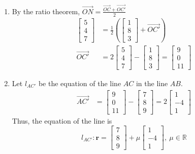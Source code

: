 \documentclass[11pt,a4paper]{book}
\newcommand{\R}{\mathbb{R}}
\begin{document}
\begin{example}
\begin{enumerate}[label=(\alph*)]
\item  By the ratio theorem, ${\displaystyle \overrightarrow{ON}=\frac{\overrightarrow{OC}+\overrightarrow{OC'}}{2}}$
\begin{align*}
\begin{bmatrix}5\\
4\\
7
\end{bmatrix} & =\frac{1}{2}\left(\begin{bmatrix}1\\
8\\
3
\end{bmatrix}+\overrightarrow{OC'}\right)\\
\overrightarrow{OC'} & =2\begin{bmatrix}5\\
4\\
7
\end{bmatrix}-\begin{bmatrix}1\\
8\\
3
\end{bmatrix}=\begin{bmatrix}9\\
0\\
11
\end{bmatrix}
\end{align*}

\item  Let $l_{AC'}$ be the equation of the line $AC$ in the line
$AB$.
\begin{align*}
\overrightarrow{AC'} & =\begin{bmatrix}9\\
0\\
11
\end{bmatrix}-\begin{bmatrix}7\\
8\\
9
\end{bmatrix}=2\begin{bmatrix}1\\
-4\\
1
\end{bmatrix}
\end{align*}
Thus, the equation of the line is
\[
l_{AC'}:\textbf{r}=\begin{bmatrix}7\\
8\\
9
\end{bmatrix}+\mu\begin{bmatrix}1\\
-4\\
1
\end{bmatrix},\:\mu\in\R
\]

\end{enumerate}

\end{example}
\end{document}
